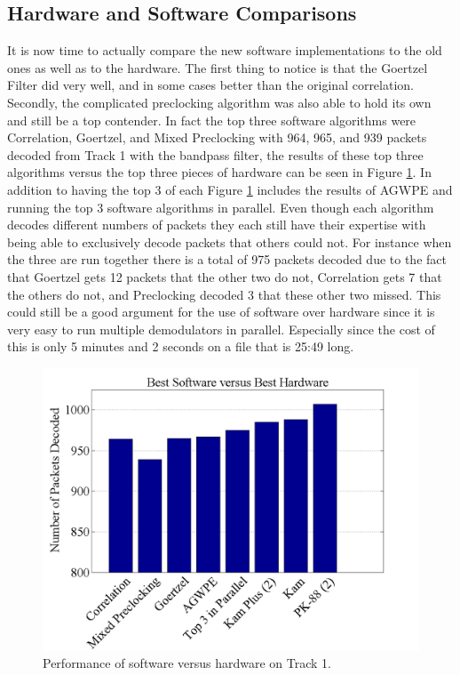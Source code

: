 \subsection{Hardware and Software Comparisons}
It is now time to actually compare the new software implementations to the old ones as well as to the hardware. The first thing to notice is that the Goertzel Filter did very well, and in some cases better than the original correlation. Secondly, the complicated preclocking algorithm was also able to hold its own and still be a top contender. In fact the top three software algorithms were Correlation, Goertzel, and Mixed Preclocking with 964, 965, and 939 packets decoded from Track 1 with the bandpass filter, the results of these top three algorithms versus the top three pieces of hardware can be seen in Figure \ref{bestHardSoft}. In addition to having the top 3 of each Figure \ref{bestHardSoft} includes the results of AGWPE and running the top 3 software algorithms in parallel. Even though each algorithm decodes different numbers of packets they each still have their expertise with being able to exclusively decode packets that others could not. For instance when the three are run together there is a total of 975 packets decoded due to the fact that Goertzel gets 12 packets that the other two do not, Correlation gets 7 that the others do not, and Preclocking decoded 3 that these other two missed. This could still be a good argument for the use of software over hardware since it is very easy to run multiple demodulators in parallel. Especially since the cost of this is only 5 minutes and 2 seconds on a file that is 25:49 long.

\begin{figure}
  \centering
	\includegraphics[width=0.75\linewidth]{images/BestSoftwareversusBestHardware.png} 
	\caption{Performance of software versus hardware on Track 1.}
   \label{bestHardSoft}
\end{figure}

